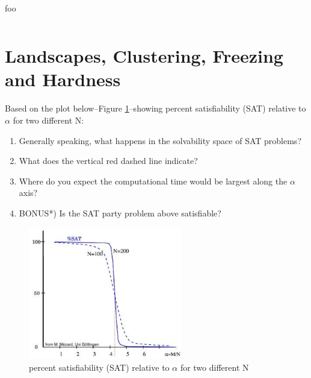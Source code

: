 \documentclass[]{article}
\begin{document}
\begin{table}[H]
	\begin{center}
		\caption{foo}\label{eq:foo}
		\begin{tabular}{|c|c|}\hline
			&\\ \hline
		\end{tabular}
	\end{center}
\end{table}

\section{Landscapes, Clustering, Freezing and Hardness}

Based on the plot below--Figure \ref{fig:content_SATalpha}--showing percent satisfiability (SAT) relative to $\alpha$ for two different N:

\begin{enumerate}
	\item  Generally speaking, what happens in the solvability space of SAT problems?

	\item  What does the vertical red dashed line indicate?

	\item   Where do you expect the computational time would be largest along the $\alpha$ axis?

	\item   BONUS*) Is the SAT party problem above satisfiable?
\end{enumerate}


\begin{figure}[H]
	\begin{center}
		\caption{percent satisfiability (SAT) relative to $\alpha$ for two different N}\label{fig:content_SATalpha}
		\includegraphics[width=0.6\textwidth]{content_SATalpha}
	\end{center}
\end{figure}


\raggedright
{}

\end{document}
